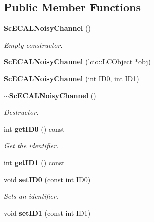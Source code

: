 \subsection*{Public Member Functions}
\begin{DoxyCompactItemize}
\item 
{\bf Sc\-E\-C\-A\-L\-Noisy\-Channel} ()\label{classCALICE_1_1ScECALNoisyChannel_abba990d4e99f022acc1910aa8276d8d6}

\begin{DoxyCompactList}\small\item\em Empty constructor. \end{DoxyCompactList}\item 
{\bfseries Sc\-E\-C\-A\-L\-Noisy\-Channel} (lcio\-::\-L\-C\-Object $\ast$obj)\label{classCALICE_1_1ScECALNoisyChannel_a94ae8188eeeca1052e878ea283914ed3}

\item 
{\bfseries Sc\-E\-C\-A\-L\-Noisy\-Channel} (int I\-D0, int I\-D1)\label{classCALICE_1_1ScECALNoisyChannel_ad10e6bb09bce1af54f2add75ba44f4a3}

\item 
{\bf $\sim$\-Sc\-E\-C\-A\-L\-Noisy\-Channel} ()\label{classCALICE_1_1ScECALNoisyChannel_af8abb5fcb758acef14175159eecbb276}

\begin{DoxyCompactList}\small\item\em Destructor. \end{DoxyCompactList}\item 
int {\bf get\-I\-D0} () const \label{classCALICE_1_1ScECALNoisyChannel_af47f3ccdb2a1398ef12a1559d51a0d22}

\begin{DoxyCompactList}\small\item\em Get the identifier. \end{DoxyCompactList}\item 
int {\bfseries get\-I\-D1} () const \label{classCALICE_1_1ScECALNoisyChannel_a9e873106d13a24f9ec75a4fd23696936}

\item 
void {\bf set\-I\-D0} (const int I\-D0)\label{classCALICE_1_1ScECALNoisyChannel_ab72626dde01d6a27902d2899cbd7e38b}

\begin{DoxyCompactList}\small\item\em Sets an identifier. \end{DoxyCompactList}\item 
void {\bfseries set\-I\-D1} (const int I\-D1)\label{classCALICE_1_1ScECALNoisyChannel_a714bd05d4d33c055749739cd74ea8c5f}


\end{DoxyCompactItemize}
